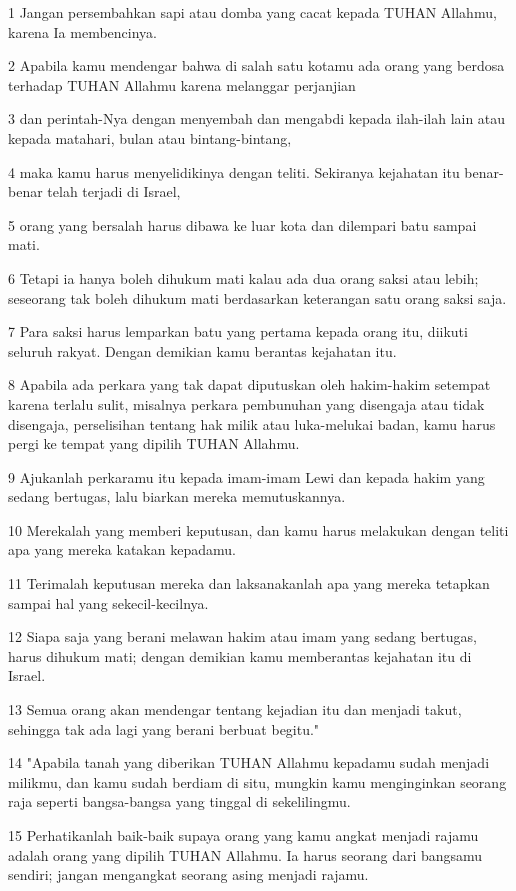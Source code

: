 \par 1 Jangan persembahkan sapi atau domba yang cacat kepada TUHAN Allahmu, karena Ia membencinya.
\par 2 Apabila kamu mendengar bahwa di salah satu kotamu ada orang yang berdosa terhadap TUHAN Allahmu karena melanggar perjanjian
\par 3 dan perintah-Nya dengan menyembah dan mengabdi kepada ilah-ilah lain atau kepada matahari, bulan atau bintang-bintang,
\par 4 maka kamu harus menyelidikinya dengan teliti. Sekiranya kejahatan itu benar-benar telah terjadi di Israel,
\par 5 orang yang bersalah harus dibawa ke luar kota dan dilempari batu sampai mati.
\par 6 Tetapi ia hanya boleh dihukum mati kalau ada dua orang saksi atau lebih; seseorang tak boleh dihukum mati berdasarkan keterangan satu orang saksi saja.
\par 7 Para saksi harus lemparkan batu yang pertama kepada orang itu, diikuti seluruh rakyat. Dengan demikian kamu berantas kejahatan itu.
\par 8 Apabila ada perkara yang tak dapat diputuskan oleh hakim-hakim setempat karena terlalu sulit, misalnya perkara pembunuhan yang disengaja atau tidak disengaja, perselisihan tentang hak milik atau luka-melukai badan, kamu harus pergi ke tempat yang dipilih TUHAN Allahmu.
\par 9 Ajukanlah perkaramu itu kepada imam-imam Lewi dan kepada hakim yang sedang bertugas, lalu biarkan mereka memutuskannya.
\par 10 Merekalah yang memberi keputusan, dan kamu harus melakukan dengan teliti apa yang mereka katakan kepadamu.
\par 11 Terimalah keputusan mereka dan laksanakanlah apa yang mereka tetapkan sampai hal yang sekecil-kecilnya.
\par 12 Siapa saja yang berani melawan hakim atau imam yang sedang bertugas, harus dihukum mati; dengan demikian kamu memberantas kejahatan itu di Israel.
\par 13 Semua orang akan mendengar tentang kejadian itu dan menjadi takut, sehingga tak ada lagi yang berani berbuat begitu."
\par 14 "Apabila tanah yang diberikan TUHAN Allahmu kepadamu sudah menjadi milikmu, dan kamu sudah berdiam di situ, mungkin kamu menginginkan seorang raja seperti bangsa-bangsa yang tinggal di sekelilingmu.
\par 15 Perhatikanlah baik-baik supaya orang yang kamu angkat menjadi rajamu adalah orang yang dipilih TUHAN Allahmu. Ia harus seorang dari bangsamu sendiri; jangan mengangkat seorang asing menjadi rajamu.
